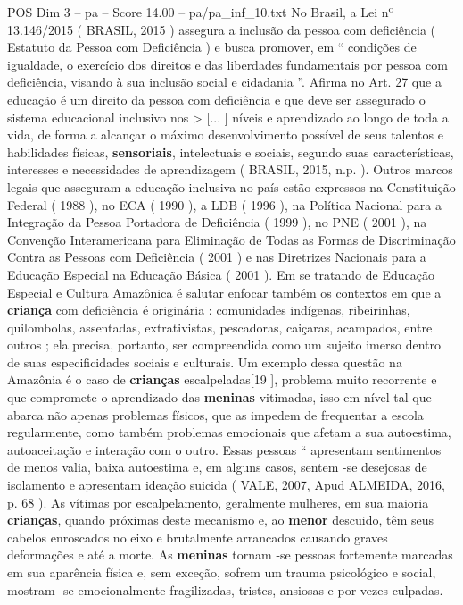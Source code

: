 \begin{textsample}{POS Dim 3 – pa – Score 14.00 – pa/pa\_inf\_10.txt}
No Brasil, a Lei nº 13.146/2015 ( BRASIL, 2015 ) assegura a inclusão da pessoa com deficiência ( Estatuto da Pessoa com Deficiência ) e busca promover, em “ condições de igualdade, o exercício dos direitos e das liberdades fundamentais por pessoa com deficiência, visando à sua inclusão social e cidadania ”.
Afirma no Art. 27 que a educação é um direito da pessoa com deficiência e que deve ser assegurado o sistema educacional inclusivo nos > [... ] níveis e aprendizado ao longo de toda a vida, de forma a alcançar o máximo desenvolvimento possível de seus talentos e habilidades físicas, \textbf{sensoriais}, intelectuais e sociais, segundo suas características, interesses e necessidades de aprendizagem ( BRASIL, 2015, n.p. ).
Outros marcos legais que asseguram a educação inclusiva no país estão expressos na Constituição Federal ( 1988 ), no ECA ( 1990 ), a LDB ( 1996 ), na Política Nacional para a Integração da Pessoa Portadora de Deficiência ( 1999 ), no PNE ( 2001 ), na Convenção Interamericana para Eliminação de Todas as Formas de Discriminação Contra as Pessoas com Deficiência ( 2001 ) e nas Diretrizes Nacionais para a Educação Especial na Educação Básica ( 2001 ).
Em se tratando de Educação Especial e Cultura Amazônica é salutar enfocar também os contextos em que a \textbf{criança} com deficiência é originária : comunidades indígenas, ribeirinhas, quilombolas, assentadas, extrativistas, pescadoras, caiçaras, acampados, entre outros ; ela precisa, portanto, ser compreendida como um sujeito imerso dentro de suas especificidades sociais e culturais.
Um exemplo dessa questão na Amazônia é o caso de \textbf{crianças} escalpeladas[19 ], problema muito recorrente e que compromete o aprendizado das \textbf{meninas} vitimadas, isso em nível tal que abarca não apenas problemas físicos, que as impedem de frequentar a escola regularmente, como também problemas emocionais que afetam a sua autoestima, autoaceitação e interação com o outro.
Essas pessoas “ apresentam sentimentos de menos valia, baixa autoestima e, em alguns casos, sentem -se desejosas de isolamento e apresentam ideação suicida ( VALE, 2007, Apud ALMEIDA, 2016, p. 68 ).
As vítimas por escalpelamento, geralmente mulheres, em sua maioria \textbf{crianças}, quando próximas deste mecanismo e, ao \textbf{menor} descuido, têm seus cabelos enroscados no eixo e brutalmente arrancados causando graves deformações e até a morte.
As \textbf{meninas} tornam -se pessoas fortemente marcadas em sua aparência física e, sem exceção, sofrem um trauma psicológico e social, mostram -se emocionalmente fragilizadas, tristes, ansiosas e por vezes culpadas.

\end{textsample}
